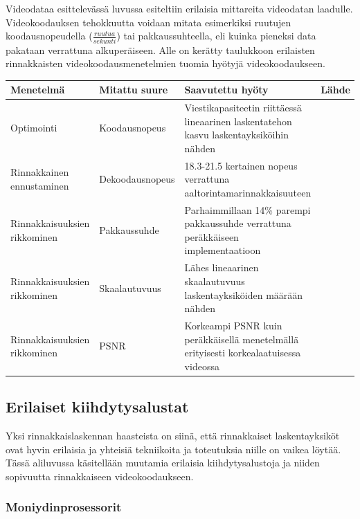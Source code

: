 Videodataa esittelevässä luvussa esiteltiin erilaisia mittareita videodatan
laadulle. Videokoodauksen tehokkuutta voidaan mitata esimerkiksi ruutujen
koodausnopeudella ($\frac{ruutua}{sekunti}$) tai pakkaussuhteella, eli kuinka
pieneksi data pakataan verrattuna alkuperäiseen. Alle on kerätty taulukkoon
erilaisten rinnakkaisten videokoodausmenetelmien tuomia hyötyjä
videokoodaukseen.

\begin{center}
\begin{tabular}{| p{} | p{}| p{}| p{}|}
	\hline
	Menetelmä & Mitattu suure & Saavutettu hyöty & Lähde \\
	\hline\hline
	Optimointi & Koodausnopeus & Viestikapasiteetin riittäessä lineaarinen laskentatehon kasvu laskentayksiköihin nähden
			\citealt{li}& \\
	\hline
	Rinnakkainen ennustaminen & Dekoodausnopeus &
			18.3-21.5 kertainen nopeus verrattuna aaltorintamarinnakkaisuuteen & \citealt{pieters} \\
	\hline
	Rinnakkaisuuksien rikkominen & Pakkaussuhde & Parhaimmillaan 14\% parempi pakkaussuhde verrattuna
			peräkkäiseen implementaatioon & \citealt{xu} \\
	\hline
	Rinnakkaisuuksien rikkominen & Skaalautuvuus & Lähes lineaarinen skaalautuvuus laskentayksiköiden määrään nähden &
			\citealt{xu} \\
	\hline
	Rinnakkaisuuksien rikkominen & PSNR & Korkeampi PSNR kuin peräkkäisellä menetelmällä erityisesti korkealaatuisessa videossa &
			\citealt{xu} \\
	\hline
\end{tabular}
\end{center}

\subsection{Erilaiset kiihdytysalustat}

Yksi rinnakkaislaskennan haasteista on siinä, että rinnakkaiset laskentayksiköt
ovat hyvin erilaisia ja yhteisiä tekniikoita ja toteutuksia niille on vaikea
löytää. Tässä aliluvussa käsitellään muutamia erilaisia kiihdytysalustoja ja
niiden sopivuutta rinnakkaiseen videokoodaukseen.

\subsubsection{Moniydinprosessorit}

